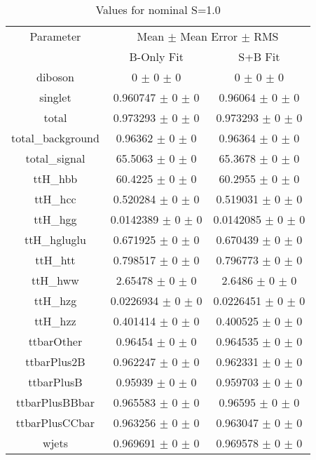 \begin{table}
\centering
\caption{Values for nominal S=1.0}
\begin{tabular}{ccc}
\toprule
Parameter 	& \multicolumn{2}{c}{Mean $\pm$ Mean Error $\pm$ RMS}\\
 	& B-Only Fit & S+B Fit\\
\midrule
diboson 	& \num{0} $\pm$ \num{0} $\pm$ \num{0} 	& \num{0} $\pm$ \num{0} $\pm$ \num{0}\\
singlet 	& \num{0.960747} $\pm$ \num{0} $\pm$ \num{0} 	& \num{0.96064} $\pm$ \num{0} $\pm$ \num{0}\\
total 	& \num{0.973293} $\pm$ \num{0} $\pm$ \num{0} 	& \num{0.973293} $\pm$ \num{0} $\pm$ \num{0}\\
total\_background 	& \num{0.96362} $\pm$ \num{0} $\pm$ \num{0} 	& \num{0.96364} $\pm$ \num{0} $\pm$ \num{0}\\
total\_signal 	& \num{65.5063} $\pm$ \num{0} $\pm$ \num{0} 	& \num{65.3678} $\pm$ \num{0} $\pm$ \num{0}\\
ttH\_hbb 	& \num{60.4225} $\pm$ \num{0} $\pm$ \num{0} 	& \num{60.2955} $\pm$ \num{0} $\pm$ \num{0}\\
ttH\_hcc 	& \num{0.520284} $\pm$ \num{0} $\pm$ \num{0} 	& \num{0.519031} $\pm$ \num{0} $\pm$ \num{0}\\
ttH\_hgg 	& \num{0.0142389} $\pm$ \num{0} $\pm$ \num{0} 	& \num{0.0142085} $\pm$ \num{0} $\pm$ \num{0}\\
ttH\_hgluglu 	& \num{0.671925} $\pm$ \num{0} $\pm$ \num{0} 	& \num{0.670439} $\pm$ \num{0} $\pm$ \num{0}\\
ttH\_htt 	& \num{0.798517} $\pm$ \num{0} $\pm$ \num{0} 	& \num{0.796773} $\pm$ \num{0} $\pm$ \num{0}\\
ttH\_hww 	& \num{2.65478} $\pm$ \num{0} $\pm$ \num{0} 	& \num{2.6486} $\pm$ \num{0} $\pm$ \num{0}\\
ttH\_hzg 	& \num{0.0226934} $\pm$ \num{0} $\pm$ \num{0} 	& \num{0.0226451} $\pm$ \num{0} $\pm$ \num{0}\\
ttH\_hzz 	& \num{0.401414} $\pm$ \num{0} $\pm$ \num{0} 	& \num{0.400525} $\pm$ \num{0} $\pm$ \num{0}\\
ttbarOther 	& \num{0.96454} $\pm$ \num{0} $\pm$ \num{0} 	& \num{0.964535} $\pm$ \num{0} $\pm$ \num{0}\\
ttbarPlus2B 	& \num{0.962247} $\pm$ \num{0} $\pm$ \num{0} 	& \num{0.962331} $\pm$ \num{0} $\pm$ \num{0}\\
ttbarPlusB 	& \num{0.95939} $\pm$ \num{0} $\pm$ \num{0} 	& \num{0.959703} $\pm$ \num{0} $\pm$ \num{0}\\
ttbarPlusBBbar 	& \num{0.965583} $\pm$ \num{0} $\pm$ \num{0} 	& \num{0.96595} $\pm$ \num{0} $\pm$ \num{0}\\
ttbarPlusCCbar 	& \num{0.963256} $\pm$ \num{0} $\pm$ \num{0} 	& \num{0.963047} $\pm$ \num{0} $\pm$ \num{0}\\
wjets 	& \num{0.969691} $\pm$ \num{0} $\pm$ \num{0} 	& \num{0.969578} $\pm$ \num{0} $\pm$ \num{0}\\
\bottomrule
\end{tabular}
\end{table}